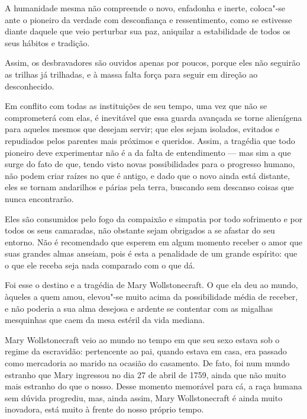 A humanidade mesma não compreende o novo, enfadonha e inerte, coloca"-se
ante o pioneiro da verdade com desconfiança e ressentimento, como se
estivesse diante daquele que veio perturbar sua paz, aniquilar a
estabilidade de todos os seus hábitos e tradição.

Assim, os desbravadores são ouvidos apenas por poucos, porque eles não
seguirão as trilhas já trilhadas, e à massa falta força para seguir
em direção ao desconhecido.

Em conflito com todas as instituições de seu tempo, uma vez que não se
comprometerá com elas, é inevitável que essa guarda avançada se torne
alienígena para aqueles mesmos que desejam servir; que eles sejam
isolados, evitados e repudiados pelos parentes mais próximos e queridos.
Assim, a tragédia que todo pioneiro deve experimentar não é a da falta
de entendimento --- mas sim a que surge do fato de que, tendo visto novas
possibilidades para o progresso humano, não podem criar
raízes no que é antigo, e dado que o novo ainda está distante, eles se
tornam andarilhos e párias pela terra, buscando sem descanso coisas
que nunca encontrarão.

Eles são consumidos pelo fogo da compaixão e simpatia por todo
sofrimento e por todos os seus camaradas, não obstante sejam obrigados a
se afastar do seu entorno. Não é recomendado que esperem em algum
momento receber o amor que suas grandes almas anseiam, pois é esta a
penalidade de um grande espírito: que o que ele receba seja nada
comparado com o que dá.

Foi esse o destino e a tragédia de Mary Wollstonecraft. O que ela deu ao
mundo, àqueles a quem amou, elevou"-se muito acima da possibilidade média
de receber, e não poderia a sua alma desejosa e ardente se contentar com
as migalhas mesquinhas que caem da mesa estéril da vida mediana.

Mary Wollstonecraft veio ao mundo no tempo em que seu sexo estava sob o
regime da escravidão: pertencente ao pai, quando estava em casa, era
passado como mercadoria ao marido na ocasião do casamento. De fato, foi
num mundo estranho que Mary ingressou no dia 27 de abril de
1759, ainda que não muito mais estranho do que o nosso. Desse momento
memorável para cá, a raça humana sem dúvida progrediu, mas, ainda assim,
Mary Wollstonecraft é ainda muito inovadora, está muito à frente do
nosso próprio tempo.

